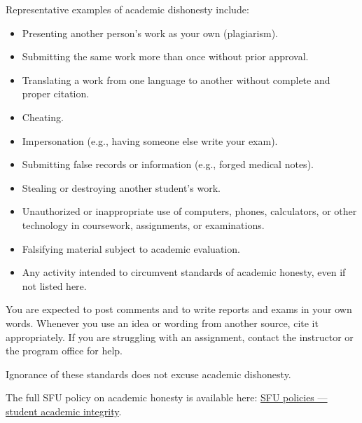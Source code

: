 \documentclass[
  letterpaper,
  DIV=11,
  numbers=noendperiod]{scrartcl}
\providecommand{\tightlist}{%
  \setlength{\itemsep}{0pt}\setlength{\parskip}{0pt}}
\begin{document}
Representative examples of academic dishonesty include:

\begin{itemize}
\tightlist
\item
  Presenting another person's work as your own (plagiarism).
\item
  Submitting the same work more than once without prior approval.
\item
  Translating a work from one language to another without complete and
  proper citation.
\item
  Cheating.
\item
  Impersonation (e.g., having someone else write your exam).
\item
  Submitting false records or information (e.g., forged medical notes).
\item
  Stealing or destroying another student's work.
\item
  Unauthorized or inappropriate use of computers, phones, calculators,
  or other technology in coursework, assignments, or examinations.
\item
  Falsifying material subject to academic evaluation.
\item
  Any activity intended to circumvent standards of academic honesty,
  even if not listed here.
\end{itemize}

You are expected to post comments and to write reports and exams in your
own words. Whenever you use an idea or wording from another source, cite
it appropriately. If you are struggling with an assignment, contact the
instructor or the program office for help.

Ignorance of these standards does not excuse academic dishonesty.

The full SFU policy on academic honesty is available here:
\href{https://www.sfu.ca/policies/gazette/student.html}{SFU policies ---
student academic integrity}.
\end{document}
